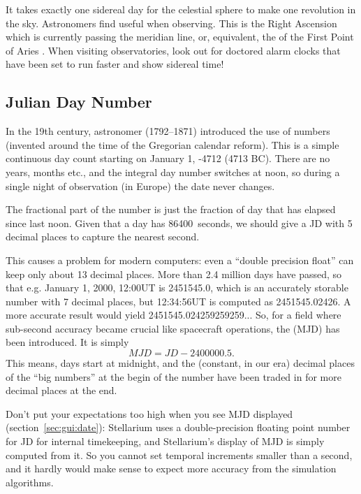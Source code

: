 It takes exactly one sidereal day for the celestial sphere to make one
revolution in the sky. Astronomers find 
useful when observing. This is the Right Ascension which is currently
passing the meridian line, or, equivalent, the 
of the First Point of Aries \Aries.  When visiting observatories, look
out for doctored alarm clocks that have been set to run faster and
show sidereal time!

\subsection{Julian Day Number}
\label{sec:Concepts:JulianDay}

In the 19th century, astronomer  (1792--1871) introduced the use of
 numbers (invented around the time of the Gregorian calendar
reform). This is a simple continuous day count starting on January 1, -4712
(4713 BC). There are no years, months etc., and the integral day
number switches at noon, so during a single night of observation (in
Europe) the date never changes. 

The fractional part of the number is just the fraction of day that has
elapsed since last noon. Given that a day has 86400~seconds, we should
give a JD with 5 decimal places to capture the nearest second.

This causes a problem for modern computers: even a ``double precision
float'' can keep only about 13 decimal places. More than 2.4 million
days have passed, so that e.g. January 1, 2000, 12:00UT is 2451545.0,
which is an accurately storable number with 7 decimal places, but 12:34:56UT is computed as
2451545.02426. A more accurate result would yield
2451545.024259259259... So, for a field where sub-second accuracy
became crucial like spacecraft operations, the  (MJD) has been introduced. It is simply
\begin{equation}
  \label{eq:MJD}
  MJD=JD-2400000.5. 
\end{equation}
This means, days start at midnight, and the (constant, in our era)
decimal places of the ``big numbers'' at the begin of the number have
been traded in for more decimal places at the end. 

Don't put your expectations too high when you see MJD displayed
(section~\ref{sec:gui:date}): Stellarium uses a double-precision
floating point number for JD for internal timekeeping, and Stellarium's
display of MJD is simply computed from it. So you cannot set temporal
increments smaller than a second, and it hardly would make sense to
expect more accuracy from the simulation algorithms.


